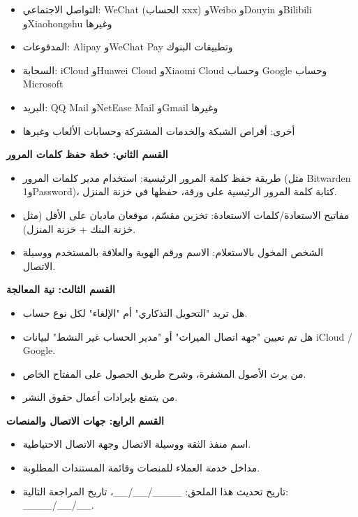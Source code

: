 \begin{itemize}
  \item التواصل الاجتماعي: WeChat (الحساب xxx) وWeibo وDouyin وBilibili وXiaohongshu وغيرها
  \item المدفوعات: Alipay وWeChat Pay وتطبيقات البنوك
  \item السحابة: iCloud وHuawei Cloud وXiaomi Cloud وحساب Google وحساب Microsoft
  \item البريد: QQ Mail وNetEase Mail وGmail وغيرها
  \item أخرى: أقراص الشبكة والخدمات المشتركة وحسابات الألعاب وغيرها
\end{itemize}

\textbf{القسم الثاني: خطة حفظ كلمات المرور}

\begin{itemize}
  \item طريقة حفظ كلمة المرور الرئيسية: استخدام مدير كلمات المرور (مثل Bitwarden و1Password)، كتابة كلمة المرور الرئيسية على ورقة، حفظها في خزنة المنزل.
  \item مفاتيح الاستعادة/كلمات الاستعادة: تخزين مقسّم، موقعان ماديان على الأقل (مثل خزنة البنك + خزنة المنزل).
  \item الشخص المخول بالاستعلام: الاسم ورقم الهوية والعلاقة بالمستخدم ووسيلة الاتصال.
\end{itemize}

\textbf{القسم الثالث: نية المعالجة}

\begin{itemize}
  \item هل تريد "التحويل التذكاري" أم "الإلغاء" لكل نوع حساب.
  \item هل تم تعيين "جهة اتصال الميراث" أو "مدير الحساب غير النشط" لبيانات iCloud / Google.
  \item من يرث الأصول المشفرة، وشرح طريق الحصول على المفتاح الخاص.
  \item من يتمتع بإيرادات أعمال حقوق النشر.
\end{itemize}

\textbf{القسم الرابع: جهات الاتصال والمنصات}

\begin{itemize}
  \item اسم منفذ الثقة ووسيلة الاتصال وجهة الاتصال الاحتياطية.
  \item مداخل خدمة العملاء للمنصات وقائمة المستندات المطلوبة.
  \item تاريخ تحديث هذا الملحق: \_\_\_\_/\_\_/\_\_، تاريخ المراجعة التالية: \_\_\_\_/\_\_/\_\_.
\end{itemize}

